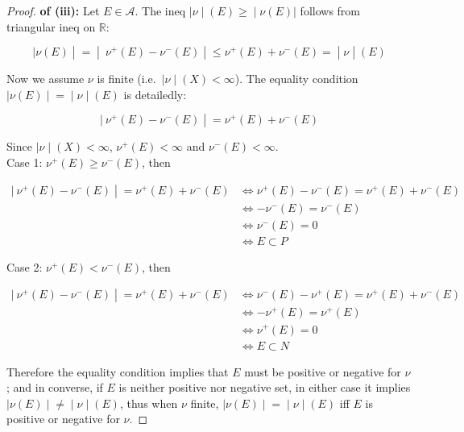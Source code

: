 \documentclass{qlnotes-export}
\begin{document}
\begin{proof}

\textbf{of (iii):} Let \(E \in \mathcal{A}\). The ineq \(\left. |\nu \middle| (E) \geq \middle| \nu(E)| \right.\) follows from triangular ineq on \(\mathbb{R}\):

\[\left. |\nu(E) \middle| = \middle| \ \nu^{+}(E) - \nu^{-}(E) \middle| \leq \nu^{+}(E) + \nu^{-}(E) = \middle| \nu \middle| (E) \right.\]

Now we assume \(\nu\) is finite (i.e.~\(\left. |\nu \middle| (X) < \infty \right.\)). The equality condition \(\left. |\nu(E) \middle| = \middle| \nu \middle| (E) \right.\) is detailedly:

\[\left. |\ \nu^{+}(E) - \nu^{-}(E) \middle| = \nu^{+}(E) + \nu^{-}(E) \right.\]

Since \(\left. |\nu \middle| (X) < \infty \right.\), \(\nu^{+}(E) < \infty\) and \(\nu^{-}(E) < \infty\).\\
Case 1: \(\nu^{+}(E) \geq \nu^{-}(E)\), then

\[\begin{matrix}
\left. |\ \nu^{+}(E) - \nu^{-}(E) \middle| = \nu^{+}(E) + \nu^{-}(E) \right. & {\Leftrightarrow\nu^{+}(E) - \nu^{-}(E) = \nu^{+}(E) + \nu^{-}(E)} \\
 & {\Leftrightarrow - \nu^{-}(E) = \nu^{-}(E)} \\
 & {\Leftrightarrow\nu^{-}(E) = 0} \\
 & {\Leftrightarrow E \subset P}
\end{matrix}\]

Case 2: \(\nu^{+}(E) < \nu^{-}(E)\), then

\[\begin{matrix}
\left. |\ \nu^{+}(E) - \nu^{-}(E) \middle| = \nu^{+}(E) + \nu^{-}(E) \right. & {\Leftrightarrow\nu^{-}(E) - \nu^{+}(E) = \nu^{+}(E) + \nu^{-}(E)} \\
 & {\Leftrightarrow - \nu^{+}(E) = \nu^{+}(E)} \\
 & {\Leftrightarrow\nu^{+}(E) = 0} \\
 & {\Leftrightarrow E \subset N}
\end{matrix}\]

Therefore the equality condition implies that \(E\) must be positive or negative for \(\nu\); and in converse, if \(E\) is neither positive nor negative set, in either case it implies \(\left. |\nu(E) \middle| \neq \middle| \nu \middle| (E) \right.\), thus when \(\nu\) finite, \(\left. |\nu(E) \middle| = \middle| \nu \middle| (E) \right.\) iff \(E\) is positive or negative for \(\nu\).

\end{proof}
\end{document}
